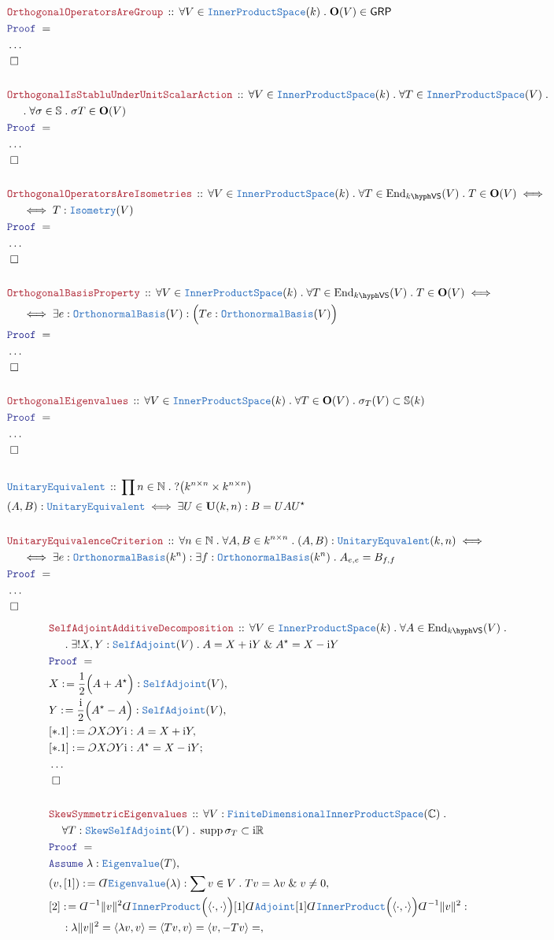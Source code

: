\documentclass[12pt]{scrartcl}%
\newcommand{\TYPE}[1]{\textcolor{NavyBlue}{\mathtt{#1}}}%
\newcommand{\LOGIC}[1]{\textcolor{Blue}{\mathtt{#1}}}%
\newcommand{\THM}[1]{\textcolor{Maroon}{\mathtt{#1}}}%
\renewcommand{\.}{\; . \;} %
\newcommand{\de}{: \kern 0.1pc =} %
\newcommand{\Theorem}[2]{& \THM{#1} \, :: \, #2 \\ & \Proof = \\ } %
\newcommand{\DeclareType}[2]{& \TYPE{#1} \, :: \, #2 \\}%
\newcommand{\DefineType}[3]{& #1 : \TYPE{#2} \iff #3 \\}%
\newcommand{\NewLine}{\\ & \kern 1pc}%
\newcommand{\Page}[1]{ \begin{align*} #1 \end{align*}  }%
\newcommand{ \bd }{ \ByDef }%
\newcommand{\NoProof}{ & \ldots \\ \EndProof}%
\renewcommand{\And}{\; \& \;}%
\newcommand{\Reals}{\mathbb{R}}%
\newcommand{\Complex}{\mathbb{C}}%
\newcommand{\Nat}{\mathbb{N}}%
\DeclareMathOperator*{\supp}{supp}%
\newcommand{\End}{\mathrm{End}}%
\newcommand{\Say}[3]{& #1 \de #2 : #3, \\} %
\newcommand{\Conclude}[3]{& #1 \de #2 : #3; \\}%
\newcommand{\Assume}[2]{& \LOGIC{Assume} \; #1 : #2, \\} %
\newcommand{\QED}{\; \square} %
\newcommand{\EndProof}{& \QED \\} %
\newcommand{\ByDef}{\rotatebox[origin=c]{-180}{$D$}}%
\newcommand{\ByConstr}{\rotatebox[origin=c]{-180}{$C$}}%
\newcommand{\Proof}{\LOGIC{Proof} \; } %
\newcommand{\GRP}{\mathsf{GRP}} %
\newcommand{\IPS}{\TYPE{InnerProductSpace}}
\newcommand{\OBasis}{\TYPE{OrthonormalBasis}}
\newcommand{\FDIPS}{\TYPE{FiniteDimensionalInnerProductSpace}}
\newcommand{\SA}{\TYPE{SelfAdjoint}}
\newcommand{\SSA}{\TYPE{SkewSelfAdjoint}}
\newcommand{\VS}[1]{#1\hyph\mathsf{VS}} %
\renewcommand{\O}{\mathbf{O}}
\newcommand{\U}{\mathbf{U}}
\begin{document}
\Page{
	\Theorem{OrthogonalOperatorsAreGroup}{\forall V \in \IPS(k) \. \O(V) \in \GRP} 
	\NoProof
	\\
	\Theorem{OrthogonalIsStabluUnderUnitScalarAction}{\forall V \in \IPS(k) \. \forall T \in \IPS(V) \.  \NewLine \. \forall \sigma \in \mathbb{S} \. \sigma T \in \O(V)}
	\NoProof
	\\
	\Theorem{OrthogonalOperatorsAreIsometries}{\forall V \in \IPS(k) \. \forall T \in \End_{\VS{k}}(V) \. T \in \O(V) \iff \NewLine \iff T : \TYPE{Isometry}(V)}
	\NoProof
	\\
	\Theorem{OrthogonalBasisProperty}{
		\forall V \in \IPS(k) \. 
		\forall T \in \End_{\VS{k}}(V) \. 
		T \in \O(V) \iff \NewLine \iff 
		\exists e : \OBasis(V) : 
		\Big( Te : \OBasis(V)  \Big)
		}
	\NoProof
	\\
	\Theorem{OrthogonalEigenvalues}{\forall V \in \IPS(k) \. \forall T \in \O(V) \. \sigma_T(V) \subset \mathbb{S}(k)}
	\NoProof
	\\
	\DeclareType{UnitaryEquivalent}{\prod n \in \Nat \.? \big(k^{n \times n}\times k^{n \times n}\big) }
	\DefineType{(A,B)}{UnitaryEquivalent}{\exists U \in \U(k,n) :   B = U A U^\star}
	\\
	\Theorem{UnitaryEquivalenceCriterion}{\forall n \in \Nat \. \forall A,B \in k^{n \times n} \. (A,B) : \TYPE{UnitaryEquvalent}(k,n) \iff \NewLine 
	\iff  \exists e : \OBasis(k^n) : \exists  f : \OBasis(k^n) \.  A_{e,e} = B_{f,f}}
	\NoProof
}\Page{
	\Theorem{SelfAdjointAdditiveDecomposition}{\forall V \in \IPS(k) \. \forall A \in \End_{\VS{k}}(V) \. \NewLine \. \exists! X,Y : \SA(V) \.   A = X + \mathrm{i}Y \And A^\star = X - \mathrm{i}Y } 
	\Say{X}{\frac{1}{2}\Big(A + A^\star\Big)}{\SA(V)}
	\Say{Y}{ \frac{\mathrm{i}}{2}\Big(A^\star  - A \Big)}{\SA(V)}
	\Say{[*.1]}{\ByConstr X \ByConstr Y \mathrm{i}}{ A = X + \mathrm{i}Y   }
	\Conclude{[*.1]}{\ByConstr X \ByConstr Y \mathrm{i}}{ A^\star = X - \mathrm{i}Y   }
	\NoProof
	\\
	\Theorem{SkewSymmetricEigenvalues}{ \forall V : \FDIPS(\Complex) \. \NewLine \forall T : \SSA(V) \.  \supp \sigma_T \subset  \mathrm{i}\Reals }
	\Assume{\lambda}{\TYPE{Eigenvalue}(T)}
	\Say{(v,[1])}{ \bd \TYPE{Eigenvalue}(\lambda)}{\sum v \in V \.  Tv = \lambda v \And v \neq 0}
	\Say{[2]}{ \bd^{-1} \| v \|^2 \bd \TYPE{InnerProduct}\Big(\langle \cdot, \cdot \rangle \Big) [1] \bd \TYPE{Adjoint} [1] \bd \TYPE{InnerProduct}\Big(\langle \cdot, \cdot \rangle \Big) \bd^{-1} \| v \|^2}{ 
		\NewLine : 
		\lambda \| v \|^2 = 
		\langle \lambda v, v \rangle =  
		\langle Tv,v \rangle = 
		\langle v, -T v \rangle = 
}}
\end{document}

